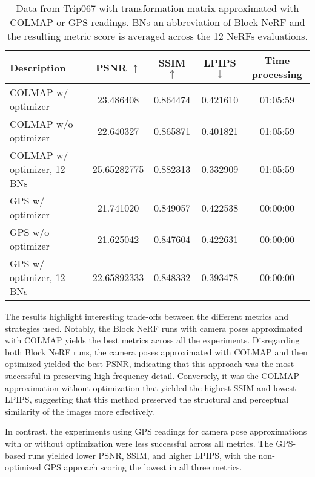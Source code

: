\begin{table}[ht]
\centering
\setlength{\tabcolsep}{6pt}
\renewcommand{\arraystretch}{1.5}
\begin{tabular}{l | C{2.2} C{1.3} C{1.3} c}
\hline
\textbf{Description} & \textbf{PSNR $\uparrow$} & \textbf{SSIM $\uparrow$} & \textbf{LPIPS $\downarrow$} & \textbf{Time processing} \\
\hline
COLMAP w/ optimizer           & 23.486408   & 0.864474 & 0.421610 & 01:05:59 \\
COLMAP w/o optimizer          & 22.640327   & 0.865871 & 0.401821 & 01:05:59 \\
COLMAP w/ optimizer, 12 BNs   & 25.65282775 & 0.882313 & 0.332909 & 01:05:59 \\
GPS w/ optimizer              & 21.741020   & 0.849057 & 0.422538 & 00:00:00 \\
GPS w/o optimizer             & 21.625042   & 0.847604 & 0.422631 & 00:00:00 \\
GPS w/ optimizer, 12 BNs      & 22.65892333 & 0.848332 & 0.393478 & 00:00:00 \\
\hline
\end{tabular}
\caption{Data from Trip067 with transformation matrix approximated with COLMAP or GPS-readings. BNs an abbreviation of Block NeRF and the resulting metric score is averaged across the 12 NeRFs evaluations.}
\label{tab:trip067-results}
\end{table}


The results highlight interesting trade-offs between the different metrics and strategies used. Notably, the Block NeRF runs with camera poses approximated with COLMAP yields the best metrics across all the experiments. Disregarding both Block NeRF runs, the camera poses approximated with COLMAP and then optimized yielded the best PSNR, indicating that this approach was the most successful in preserving high-frequency detail. Conversely, it was the COLMAP approximation without optimization that yielded the highest SSIM and lowest LPIPS, suggesting that this method preserved the structural and perceptual similarity of the images more effectively.

In contrast, the experiments using GPS readings for camera pose approximations with or without optimization were less successful across all metrics. The GPS-based runs yielded lower PSNR, SSIM, and higher LPIPS, with the non-optimized GPS approach scoring the lowest in all three metrics.


